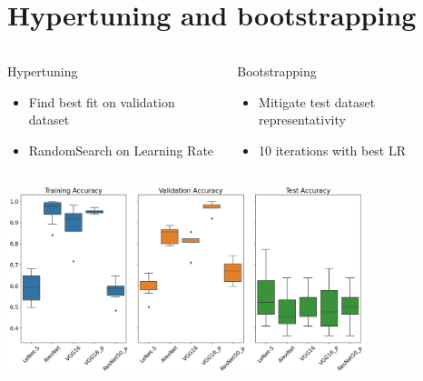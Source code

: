\documentclass[aspectratio=169]{beamer}
\begin{document}
\section{Hypertuning and bootstrapping}
\begin{frame}{}
    \begin{columns}
        \begin{block}{Hypertuning}
            \begin{itemize}
                \item Find best fit on validation dataset
                \item RandomSearch on Learning Rate
            \end{itemize}
        \end{block}
        \pause
        \begin{block}{Bootstrapping}
            \begin{itemize}
                \item Mitigate test dataset representativity
                \item 10 iterations with best LR
            \end{itemize}
        \end{block}
        \pause
    \end{columns}
    \centering
    \includegraphics[height=5.5cm]{./tex_graphs/bootstrap_results.png}
\end{frame}
\end{document}
